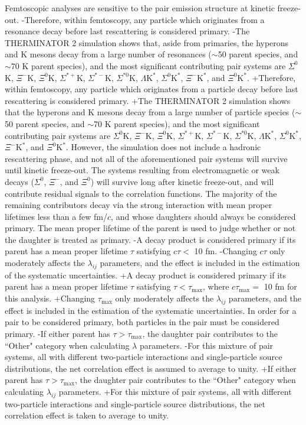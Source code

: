  
 Femtoscopic analyses are sensitive to the pair emission structure at kinetic freeze-out.
-Therefore, within femtoscopy, any particle which originates from a resonance decay before last rescattering is considered primary.
-The THERMINATOR 2 simulation shows that, aside from primaries, the \Lam hyperons and K mesons decay from a large number of resonances ($\sim$50 \Lam parent species, and $\sim$70 K parent species), and the most significant contributing pair systems are $\Sigma^{0}$K, $\Xi^{-}$K, $\Xi^{0}$K, $\Sigma^{*+}$K, $\Sigma^{*-}$K, $\Sigma^{*0}$K, $\Lambda\mathrm{K}^{*}$, $\Sigma^{0}\mathrm{K}^{*}$, $\Xi^{-}\mathrm{K}^{*}$, and $\Xi^{0}\mathrm{K}^{*}$.
+Therefore, within femtoscopy, any particle which originates from a particle decay before last rescattering is considered primary.
+The THERMINATOR 2 simulation shows that the \Lam hyperons and K mesons decay from a large number of particle species ($\sim$50 \Lam parent species, and $\sim$70 K parent species), and the most significant contributing pair systems are $\Sigma^{0}$K, $\Xi^{-}$K, $\Xi^{0}$K, $\Sigma^{*+}$K, $\Sigma^{*-}$K, $\Sigma^{*0}$K, $\Lambda\mathrm{K}^{*}$, $\Sigma^{0}\mathrm{K}^{*}$, $\Xi^{-}\mathrm{K}^{*}$, and $\Xi^{0}\mathrm{K}^{*}$.
 However, the simulation does not include a hadronic rescattering phase, and not all of the aforementioned pair systems will survive until kinetic freeze-out.
 The systems resulting from electromagnetic or weak decays ($\Sigma^{0}$, $\Xi^{-}$, and $\Xi^{0}$) will survive long after kinetic freeze-out, and will contribute residual signals to the \LamK correlation functions.
 The majority of the remaining contributors decay via the strong interaction with mean proper lifetimes less than a few fm/$c$, and whose daughters should always be considered primary.
 The mean proper lifetime of the parent is used to judge whether or not the daughter is treated as primary.
-A decay product is considered primary if its parent has a mean proper lifetime $\tau$ satisfying $c\tau <$ 10 fm.
-Changing $c\tau$ only moderately affects the $\lambda_{ij}$ parameters, and the effect is included in the estimation of the systematic uncertainties.
+A decay product is considered primary if its parent has a mean proper lifetime $\tau$ satisfying $\tau < \tau_{\mathrm{max}}$, where $c\tau_{\mathrm{max}} =$ 10 fm for this analysis.
+Changing $\tau_{\mathrm{max}}$ only moderately affects the $\lambda_{ij}$ parameters, and the effect is included in the estimation of the systematic uncertainties.
 In order for a pair to be considered primary, both particles in the pair must be considered primary. 
-If either parent has $\tau > \tau_{\mathrm{max}}$, the daughter pair contributes to the ``Other" category when calculating $\lambda$ parameters.
-For this mixture of pair systems, all with different two-particle interactions and single-particle source distributions, the net correlation effect is assumed to average to unity.
+If either parent has $\tau > \tau_{\mathrm{max}}$, the daughter pair contributes to the ``Other" category when calculating $\lambda_{ij}$ parameters.
+For this mixture of pair systems, all with different two-particle interactions and single-particle source distributions, the net correlation effect is taken to average to unity.
 
